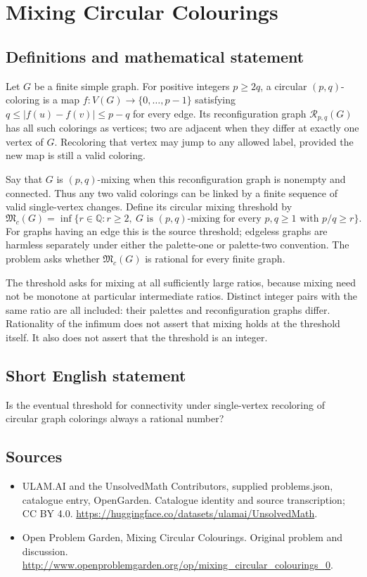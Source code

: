 \documentclass[11pt,a4paper]{article}
\begin{document}
\section*{Mixing Circular Colourings}\label{statement}

\subsection{Definitions and mathematical statement}
Let $G$ be a finite simple graph. For positive integers $p\ge2q$, a circular $(p,q)$-coloring is a map $f:V(G)\to\{0,\ldots,p-1\}$ satisfying $q\le|f(u)-f(v)|\le p-q$ for every edge. Its reconfiguration graph $\mathcal R_{p,q}(G)$ has all such colorings as vertices; two are adjacent when they differ at exactly one vertex of $G$. Recoloring that vertex may jump to any allowed label, provided the new map is still a valid coloring.

Say that $G$ is $(p,q)$-mixing when this reconfiguration graph is nonempty and connected. Thus any two valid colorings can be linked by a finite sequence of valid single-vertex changes. Define its circular mixing threshold by
\[
 \mathfrak M_c(G)=\inf\{r\in\mathbb Q:r\ge2,\ G\text{ is }(p,q)\text{-mixing}
          \text{ for every }p,q\ge1\text{ with }p/q\ge r\}.
\]
For graphs having an edge this is the source threshold; edgeless graphs are harmless separately under either the palette-one or palette-two convention. The problem asks whether $\mathfrak M_c(G)$ is rational for every finite graph.

The threshold asks for mixing at all sufficiently large ratios, because mixing need not be monotone at particular intermediate ratios. Distinct integer pairs with the same ratio are all included: their palettes and reconfiguration graphs differ. Rationality of the infimum does not assert that mixing holds at the threshold itself. It also does not assert that the threshold is an integer.
\subsection{Short English statement}
Is the eventual threshold for connectivity under single-vertex recoloring of circular graph colorings always a rational number?
\subsection{Sources}
\begin{itemize}
\item[S1] ULAM.AI and the UnsolvedMath Contributors, supplied problems.json, catalogue entry, OpenGarden. Catalogue identity and source transcription; CC BY 4.0.
\url{https://huggingface.co/datasets/ulamai/UnsolvedMath}.
\item[S2] Open Problem Garden, Mixing Circular Colourings. Original problem and discussion.
\url{http://www.openproblemgarden.org/op/mixing_circular_colourings_0}.
\end{itemize}
\end{document}
